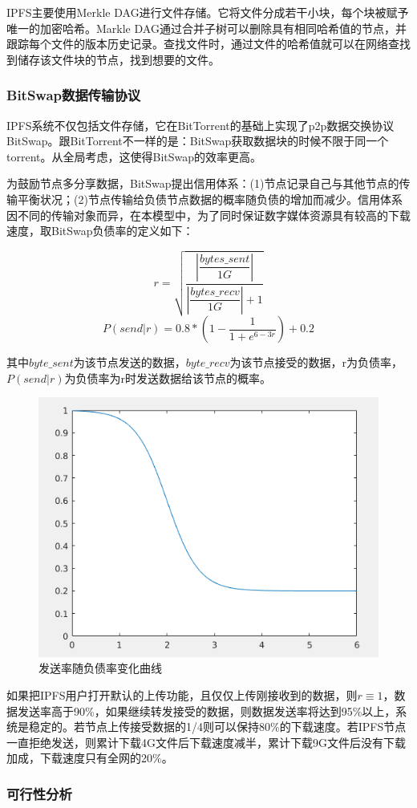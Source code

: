 \documentclass[withoutpreface,bwprint]{cumcmthesis} %
\begin{document}
IPFS主要使用Merkle DAG进行文件存储。它将文件分成若干小块，每个块被赋予唯一的加密哈希。Markle DAG通过合并子树可以删除具有相同哈希值的节点，并跟踪每个文件的版本历史记录。查找文件时，通过文件的哈希值就可以在网络查找到储存该文件块的节点，找到想要的文件。

\subsubsection{BitSwap数据传输协议}
IPFS系统不仅包括文件存储，它在BitTorrent的基础上实现了p2p数据交换协议BitSwap。跟BitTorrent不一样的是：BitSwap获取数据块的时候不限于同一个torrent。从全局考虑，这使得BitSwap的效率更高。

为鼓励节点多分享数据，BitSwap提出信用体系：(1)节点记录自己与其他节点的传输平衡状况；(2)节点传输给负债节点数据的概率随负债的增加而减少。信用体系因不同的传输对象而异，在本模型中，为了同时保证数字媒体资源具有较高的下载速度，取BitSwap负债率的定义如下：

\[ 
r=\sqrt{\dfrac{|\dfrac{bytes\_sent}{1G}|}{|\dfrac{bytes\_recv}{1G}|+1}}
\]
\[
P(send|r) = 0.8*(1 - \dfrac{1}{1+e^{6-3r}})+0.2 
\]

其中$byte\_sent$为该节点发送的数据，$byte\_recv$为该节点接受的数据，r为负债率，$P(send|r)$为负债率为r时发送数据给该节点的概率。

\begin{figure}[!h]
	\centering
	\includegraphics[width=.5\textwidth]{untitled.png}
	\caption{发送率随负债率变化曲线}
\end{figure}

如果把IPFS用户打开默认的上传功能，且仅仅上传刚接收到的数据，则$r\equiv1$，数据发送率高于90\%，如果继续转发接受的数据，则数据发送率将达到95\%以上，系统是稳定的。若节点上传接受数据的1/4则可以保持80\%的下载速度。若IPFS节点一直拒绝发送，则累计下载4G文件后下载速度减半，累计下载9G文件后没有下载加成，下载速度只有全网的20\%。

\subsubsection{可行性分析}
\end{document}
